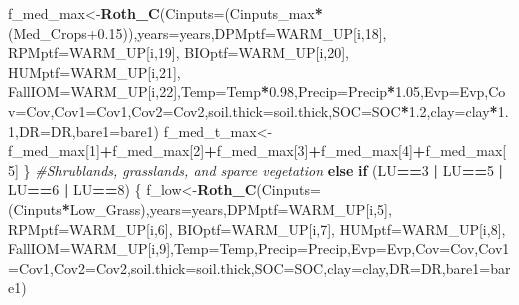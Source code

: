 \documentclass[
  10pt,
  b5paper,
]{book}
\newenvironment{Shaded}{\begin{snugshade}}{\end{snugshade}}
\newcommand{\CommentTok}[1]{\textcolor[rgb]{0.56,0.35,0.01}{\textit{#1}}}
\newcommand{\ControlFlowTok}[1]{\textcolor[rgb]{0.13,0.29,0.53}{\textbf{#1}}}
\newcommand{\DataTypeTok}[1]{\textcolor[rgb]{0.13,0.29,0.53}{#1}}
\newcommand{\DecValTok}[1]{\textcolor[rgb]{0.00,0.00,0.81}{#1}}
\newcommand{\FloatTok}[1]{\textcolor[rgb]{0.00,0.00,0.81}{#1}}
\newcommand{\KeywordTok}[1]{\textcolor[rgb]{0.13,0.29,0.53}{\textbf{#1}}}
\newcommand{\NormalTok}[1]{#1}
\newcommand{\OperatorTok}[1]{\textcolor[rgb]{0.81,0.36,0.00}{\textbf{#1}}}
\newcommand{\StringTok}[1]{\textcolor[rgb]{0.31,0.60,0.02}{#1}}
\begin{document}
\begin{Shaded}
\begin{Highlighting}[]
\NormalTok{f_med_max<-}\KeywordTok{Roth_C}\NormalTok{(}\DataTypeTok{Cinputs=}\NormalTok{(Cinputs_max}\OperatorTok{*}\NormalTok{(Med_Crops}\FloatTok{+0.15}\NormalTok{)),}\DataTypeTok{years=}\NormalTok{years,}\DataTypeTok{DPMptf=}\NormalTok{WARM_UP[i,}\DecValTok{18}\NormalTok{], }\DataTypeTok{RPMptf=}\NormalTok{WARM_UP[i,}\DecValTok{19}\NormalTok{], }\DataTypeTok{BIOptf=}\NormalTok{WARM_UP[i,}\DecValTok{20}\NormalTok{], }\DataTypeTok{HUMptf=}\NormalTok{WARM_UP[i,}\DecValTok{21}\NormalTok{], }\DataTypeTok{FallIOM=}\NormalTok{WARM_UP[i,}\DecValTok{22}\NormalTok{],}\DataTypeTok{Temp=}\NormalTok{Temp}\OperatorTok{*}\FloatTok{0.98}\NormalTok{,}\DataTypeTok{Precip=}\NormalTok{Precip}\OperatorTok{*}\FloatTok{1.05}\NormalTok{,}\DataTypeTok{Evp=}\NormalTok{Evp,}\DataTypeTok{Cov=}\NormalTok{Cov,}\DataTypeTok{Cov1=}\NormalTok{Cov1,}\DataTypeTok{Cov2=}\NormalTok{Cov2,}\DataTypeTok{soil.thick=}\NormalTok{soil.thick,}\DataTypeTok{SOC=}\NormalTok{SOC}\OperatorTok{*}\FloatTok{1.2}\NormalTok{,}\DataTypeTok{clay=}\NormalTok{clay}\OperatorTok{*}\FloatTok{1.1}\NormalTok{,}\DataTypeTok{DR=}\NormalTok{DR,}\DataTypeTok{bare1=}\NormalTok{bare1)}
\NormalTok{f_med_t_max<-f_med_max[}\DecValTok{1}\NormalTok{]}\OperatorTok{+}\NormalTok{f_med_max[}\DecValTok{2}\NormalTok{]}\OperatorTok{+}\NormalTok{f_med_max[}\DecValTok{3}\NormalTok{]}\OperatorTok{+}\NormalTok{f_med_max[}\DecValTok{4}\NormalTok{]}\OperatorTok{+}\NormalTok{f_med_max[}\DecValTok{5}\NormalTok{]}
\NormalTok{\}}
\CommentTok{#Shrublands, grasslands, and sparce vegetation}
\ControlFlowTok{else} \ControlFlowTok{if}\NormalTok{ (LU}\OperatorTok{==}\DecValTok{3} \OperatorTok{|}\StringTok{ }\NormalTok{LU}\OperatorTok{==}\DecValTok{5} \OperatorTok{|}\StringTok{ }\NormalTok{LU}\OperatorTok{==}\DecValTok{6} \OperatorTok{|}\StringTok{ }\NormalTok{LU}\OperatorTok{==}\DecValTok{8}\NormalTok{) \{}
\NormalTok{f_low<-}\KeywordTok{Roth_C}\NormalTok{(}\DataTypeTok{Cinputs=}\NormalTok{(Cinputs}\OperatorTok{*}\NormalTok{Low_Grass),}\DataTypeTok{years=}\NormalTok{years,}\DataTypeTok{DPMptf=}\NormalTok{WARM_UP[i,}\DecValTok{5}\NormalTok{], }\DataTypeTok{RPMptf=}\NormalTok{WARM_UP[i,}\DecValTok{6}\NormalTok{], }\DataTypeTok{BIOptf=}\NormalTok{WARM_UP[i,}\DecValTok{7}\NormalTok{], }\DataTypeTok{HUMptf=}\NormalTok{WARM_UP[i,}\DecValTok{8}\NormalTok{], }\DataTypeTok{FallIOM=}\NormalTok{WARM_UP[i,}\DecValTok{9}\NormalTok{],}\DataTypeTok{Temp=}\NormalTok{Temp,}\DataTypeTok{Precip=}\NormalTok{Precip,}\DataTypeTok{Evp=}\NormalTok{Evp,}\DataTypeTok{Cov=}\NormalTok{Cov,}\DataTypeTok{Cov1=}\NormalTok{Cov1,}\DataTypeTok{Cov2=}\NormalTok{Cov2,}\DataTypeTok{soil.thick=}\NormalTok{soil.thick,}\DataTypeTok{SOC=}\NormalTok{SOC,}\DataTypeTok{clay=}\NormalTok{clay,}\DataTypeTok{DR=}\NormalTok{DR,}\DataTypeTok{bare1=}\NormalTok{bare1)}

\end{Highlighting}
\end{Shaded}
\end{document}
